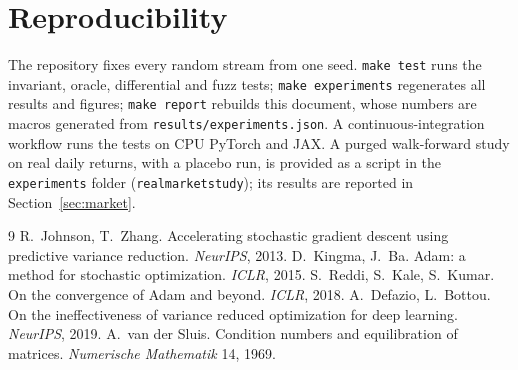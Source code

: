 \documentclass[11pt]{article}
\theoremstyle{remark}
\begin{document}
\section{Reproducibility}
The repository fixes every random stream from one seed. \texttt{make test} runs the invariant, oracle, differential and fuzz tests; \texttt{make experiments} regenerates all results and figures; \texttt{make report} rebuilds this document, whose numbers are macros generated from \texttt{results/experiments.json}. A continuous-integration workflow runs the tests on CPU PyTorch and JAX. A purged walk-forward study on real daily returns, with a placebo run, is provided as a script in the \texttt{experiments} folder (\texttt{real\-market\-study}); its results are reported in Section~\ref{sec:market}.

\begin{thebibliography}{9}
 R.~Johnson, T.~Zhang. Accelerating stochastic gradient descent using predictive variance reduction. \emph{NeurIPS}, 2013.
 D.~Kingma, J.~Ba. Adam: a method for stochastic optimization. \emph{ICLR}, 2015.
 S.~Reddi, S.~Kale, S.~Kumar. On the convergence of Adam and beyond. \emph{ICLR}, 2018.
 A.~Defazio, L.~Bottou. On the ineffectiveness of variance reduced optimization for deep learning. \emph{NeurIPS}, 2019.
 A.~van der Sluis. Condition numbers and equilibration of matrices. \emph{Numerische Mathematik} 14, 1969.
\end{thebibliography}
\end{document}
